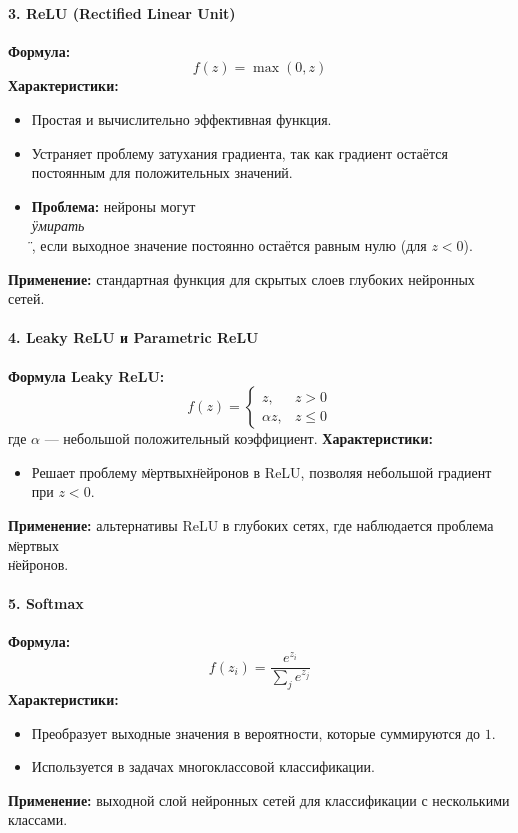 {\paragraph{3. ReLU (Rectified Linear Unit)}
\textbf{Формула:}
\[
    f(z) = \max(0, z)
\]
\textbf{Характеристики:}
\begin{itemize}
    \item Простая и вычислительно эффективная функция.
    \item Устраняет проблему затухания градиента, так как градиент остаётся постоянным для положительных значений.
    \item \textbf{Проблема:} нейроны могут \textit{\\\"умирать\\\"}, если выходное значение постоянно остаётся равным нулю (для $z < 0$).
\end{itemize}
\textbf{Применение:} стандартная функция для скрытых слоев глубоких нейронных сетей.

\paragraph{4. Leaky ReLU и Parametric ReLU}
\textbf{Формула Leaky ReLU:}
\[
    f(z) = 
    \begin{cases} 
    z, & z > 0 \\
    \alpha z, & z \leq 0
    \end{cases}
\]
где $\alpha$ — небольшой положительный коэффициент.
\textbf{Характеристики:}
\begin{itemize}
    \item Решает проблему \"мертвых\" нейронов в ReLU, позволяя небольшой градиент при $z < 0$.
\end{itemize}
\textbf{Применение:} альтернативы ReLU в глубоких сетях, где наблюдается проблема \\\"мертвых\\\" нейронов.

\paragraph{5. Softmax}
\textbf{Формула:}
\[
    f(z_i) = \frac{e^{z_i}}{\sum_{j} e^{z_j}}
\]
\textbf{Характеристики:}
\begin{itemize}
    \item Преобразует выходные значения в вероятности, которые суммируются до $1$.
    \item Используется в задачах многоклассовой классификации.
\end{itemize}
\textbf{Применение:} выходной слой нейронных сетей для классификации с несколькими классами.

}
